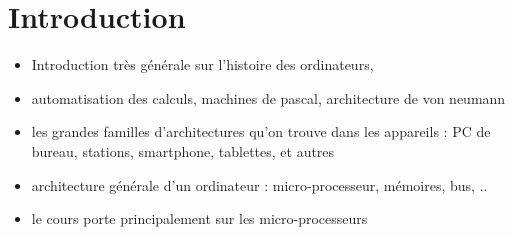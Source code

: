 \chapter{Introduction}

\begin{itemize}
\item Introduction très générale sur l'histoire des ordinateurs, 
\item automatisation des calculs, machines de pascal, architecture de von neumann
\item les grandes familles d'architectures qu'on trouve dans les appareils : PC de bureau, stations, smartphone, tablettes, et autres
\item architecture générale d'un ordinateur : micro-processeur, mémoires, bus, ..
\item le cours porte principalement sur les micro-processeurs
\end{itemize}

